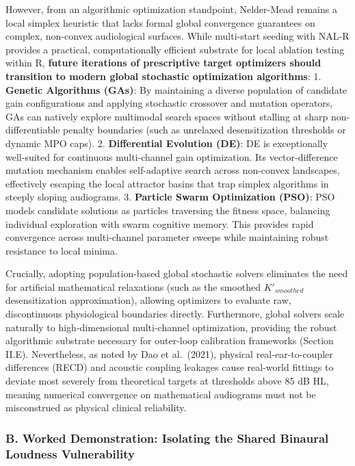 \documentclass[
  12pt,
]{article}
\begin{document}
However, from an algorithmic optimization standpoint, Nelder-Mead
remains a local simplex heuristic that lacks formal global convergence
guarantees on complex, non-convex audiological surfaces. While
multi-start seeding with NAL-R provides a practical, computationally
efficient substrate for local ablation testing within R, \textbf{future
iterations of prescriptive target optimizers should transition to modern
global stochastic optimization algorithms}: 1. \textbf{Genetic
Algorithms (GAs)}: By maintaining a diverse population of candidate gain
configurations and applying stochastic crossover and mutation operators,
GAs can natively explore multimodal search spaces without stalling at
sharp non-differentiable penalty boundaries (such as unrelaxed
desensitization thresholds or dynamic MPO caps). 2. \textbf{Differential
Evolution (DE)}: DE is exceptionally well-suited for continuous
multi-channel gain optimization. Its vector-difference mutation
mechanism enables self-adaptive search across non-convex landscapes,
effectively escaping the local attractor basins that trap simplex
algorithms in steeply sloping audiograms. 3. \textbf{Particle Swarm
Optimization (PSO)}: PSO models candidate solutions as particles
traversing the fitness space, balancing individual exploration with
swarm cognitive memory. This provides rapid convergence across
multi-channel parameter sweeps while maintaining robust resistance to
local minima.

Crucially, adopting population-based global stochastic solvers
eliminates the need for artificial mathematical relaxations (such as the
smoothed \(K'_{smoothed}\) desensitization approximation), allowing
optimizers to evaluate raw, discontinuous physiological boundaries
directly. Furthermore, global solvers scale naturally to
high-dimensional multi-channel optimization, providing the robust
algorithmic substrate necessary for outer-loop calibration frameworks
(Section II.E). Nevertheless, as noted by Dao et al.~(2021), physical
real-ear-to-coupler differences (RECD) and acoustic coupling leakages
cause real-world fittings to deviate most severely from theoretical
targets at thresholds above 85 dB HL, meaning numerical convergence on
mathematical audiograms must not be misconstrued as physical clinical
reliability.

\subsubsection{B. Worked Demonstration: Isolating the Shared Binaural
Loudness
Vulnerability}\label{b.-worked-demonstration-isolating-the-shared-binaural-loudness-vulnerability}
\end{document}
